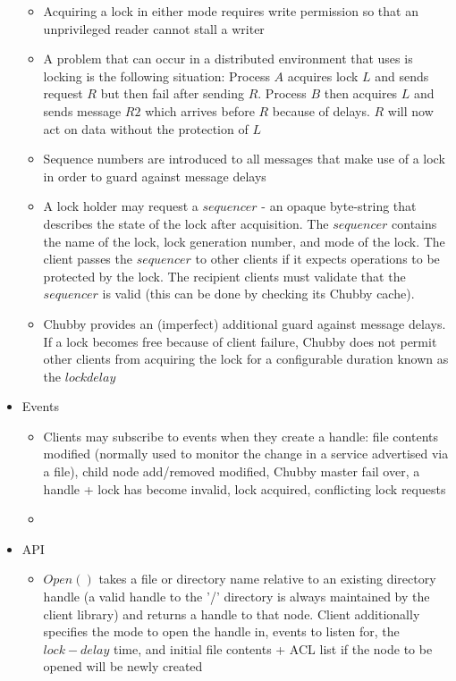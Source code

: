\documentclass[a4paper]{article}
\begin{document}
\begin{itemize}
\begin{itemize}
\item Acquiring a lock in either mode requires write permission so that an unprivileged reader cannot stall a writer

\item A problem that can occur in a distributed environment that uses is locking is the following situation: Process $A$ acquires lock $L$ and sends request $R$ but then fail after sending $R$. Process $B$ then acquires $L$ and sends message $R2$ which arrives before $R$ because of delays. $R$ will now act on data without the protection of $L$

\item Sequence numbers are introduced to all messages that make use of a lock in order to guard against message delays

\item A lock holder may request a $sequencer$ - an opaque byte-string that describes the state of the lock after acquisition. The $sequencer$ contains the name of the lock, lock generation number, and mode of the lock. The client passes the $sequencer$ to other clients if it expects operations to be protected by the lock. The recipient clients must validate that the $sequencer$ is valid (this can be done by checking its Chubby cache). 

\item Chubby provides an (imperfect) additional guard against message delays. If a lock becomes free because of client failure, Chubby does not permit other clients from acquiring the lock for a configurable duration known as the $lock delay$
\end{itemize}

\item Events
\begin{itemize}
\item Clients may subscribe to events when they create a handle: file contents modified (normally used to monitor the change in a service advertised via a file), child node add/removed modified, Chubby master fail over, a handle + lock has become invalid, lock acquired, conflicting lock requests

\item 
\end{itemize}

\item API
\begin{itemize}
\item $Open()$ takes a file or directory name relative to an existing directory handle (a valid handle to the '/' directory is always maintained by the client library) and returns a handle to that node. Client additionally specifies the mode to open the handle in, events to listen for, the $lock-delay$ time, and initial file contents + ACL list if the node to be opened will be newly created


\end{itemize}
\end{itemize}
\end{document}
